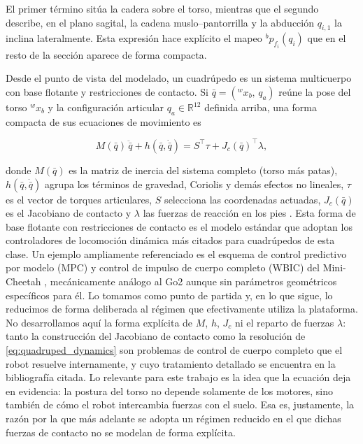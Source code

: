 \documentclass[12pt,a4paper]{report}
\begin{document}
El primer término sitúa la cadera sobre el torso, mientras que el segundo describe,
en el plano sagital, la cadena muslo--pantorrilla y la abducción \(q_{i,1}\) la inclina
lateralmente. Esta expresión hace explícito el mapeo \({}^{b}\!p_{f_i}(q_i)\) que
en el resto de la sección aparece de forma compacta.

Desde el punto de vista del modelado, un cuadrúpedo es un sistema multicuerpo
con base flotante y restricciones de contacto. Si
\(\bar q = ({}^{w}x_b,\, q_a)\) reúne la pose del torso \({}^{w}x_b\) y la
configuración articular \(q_a \in \mathbb{R}^{12}\) definida arriba, una forma
compacta de sus ecuaciones de movimiento es

\begin{equation}
M(\bar q)\,\ddot{\bar q} + h(\bar q,\dot{\bar q}) = S^\top \tau + J_c(\bar q)^\top \lambda,
\label{eq:quadruped_dynamics}
\end{equation}

donde \(M(\bar q)\) es la matriz de inercia del sistema completo (torso más
patas), \(h(\bar q,\dot{\bar q})\) agrupa los términos de gravedad, Coriolis y
demás efectos no lineales, \(\tau\) es el vector de torques articulares, \(S\)
selecciona las coordenadas actuadas, \(J_c(\bar q)\) es el Jacobiano de contacto
y \(\lambda\) las fuerzas de reacción en los pies
\citep{Bellicoso2017,Fahmi2019,Lee2013Cheetah}. Esta forma de base flotante con
restricciones de contacto es el modelo estándar que adoptan los controladores de
locomoción dinámica más citados para cuadrúpedos de esta clase. Un ejemplo
ampliamente referenciado es el esquema de control predictivo por modelo (MPC) y
control de impulso de cuerpo completo (WBIC) del Mini-Cheetah \citep{Kim2019WBIC},
mecánicamente análogo al Go2 aunque sin parámetros geométricos específicos para él.
Lo tomamos como punto de partida y, en lo que sigue, lo reducimos de forma
deliberada al régimen que efectivamente utiliza la plataforma. No desarrollamos aquí la forma
explícita de \(M\), \(h\), \(J_c\) ni el reparto de fuerzas \(\lambda\): tanto la
construcción del Jacobiano de contacto como la resolución de
\eqref{eq:quadruped_dynamics} son problemas de control de cuerpo completo que el
robot resuelve internamente, y cuyo tratamiento detallado se encuentra en la
bibliografía citada. Lo relevante para este trabajo es la idea que la ecuación
deja en evidencia: la postura del torso no depende solamente de los motores, sino
también de cómo el robot intercambia fuerzas con el suelo. Esa es, justamente, la
razón por la que más adelante se adopta un régimen reducido en el que dichas
fuerzas de contacto no se modelan de forma explícita.
\end{document}
